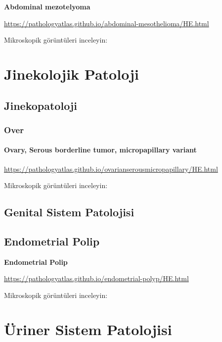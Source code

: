 \documentclass[
  letterpaper,
  DIV=11,
  numbers=noendperiod]{scrreprt}
\begin{document}
\textbf{Abdominal mezotelyoma}

\url{https://pathologyatlas.github.io/abdominal-mesothelioma/HE.html}

Mikroskopik görüntüleri inceleyin:

\part{Jinekolojik Patoloji}

\hypertarget{jinekopatoloji}{%
\chapter{Jinekopatoloji}\label{jinekopatoloji}}

\hypertarget{over}{%
\section{Over}\label{over}}

\hypertarget{ovary-serous-borderline-tumor-micropapillary-variant}{%
\subsection{Ovary, Serous borderline tumor, micropapillary
variant}\label{ovary-serous-borderline-tumor-micropapillary-variant}}

\url{https://pathologyatlas.github.io/ovarianserousmicropapillary/HE.html}

Mikroskopik görüntüleri inceleyin:

\hypertarget{genital-sistem-patolojisi}{%
\chapter{Genital Sistem Patolojisi}\label{genital-sistem-patolojisi}}

\hypertarget{endometrial-polip}{%
\chapter{Endometrial Polip}\label{endometrial-polip}}

\textbf{Endometrial Polip}

\url{https://pathologyatlas.github.io/endometrial-polyp/HE.html}

Mikroskopik görüntüleri inceleyin:

\part{Üriner Sistem Patolojisi}
\end{document}
